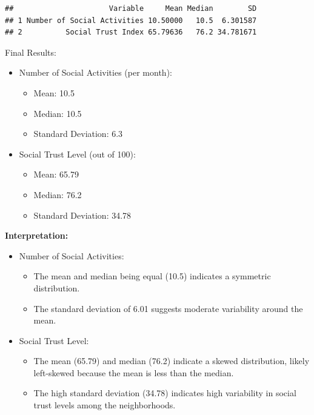\documentclass[
  11pt,
]{article}
\providecommand{\tightlist}{%
  \setlength{\itemsep}{0pt}\setlength{\parskip}{0pt}}
\begin{document}
\begin{verbatim}
##                      Variable     Mean Median        SD
## 1 Number of Social Activities 10.50000   10.5  6.301587
## 2          Social Trust Index 65.79636   76.2 34.781671
\end{verbatim}

Final Results:

\begin{itemize}
\tightlist
\item
  Number of Social Activities (per month):

  \begin{itemize}
  \tightlist
  \item
    Mean: 10.5
  \item
    Median: 10.5
  \item
    Standard Deviation: 6.3
  \end{itemize}
\item
  Social Trust Level (out of 100):

  \begin{itemize}
  \tightlist
  \item
    Mean: 65.79
  \item
    Median: 76.2
  \item
    Standard Deviation: 34.78
  \end{itemize}
\end{itemize}

\textbf{Interpretation:}

\begin{itemize}
\tightlist
\item
  Number of Social Activities:

  \begin{itemize}
  \tightlist
  \item
    The mean and median being equal (10.5) indicates a symmetric
    distribution.
  \item
    The standard deviation of 6.01 suggests moderate variability around
    the mean.
  \end{itemize}
\item
  Social Trust Level:

  \begin{itemize}
  \tightlist
  \item
    The mean (65.79) and median (76.2) indicate a skewed distribution,
    likely left-skewed because the mean is less than the median.
  \item
    The high standard deviation (34.78) indicates high variability in
    social trust levels among the neighborhoods.
  \end{itemize}
\end{itemize}
\end{document}
